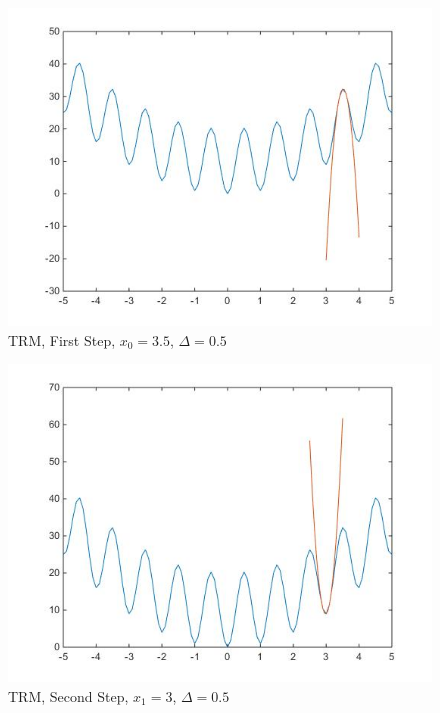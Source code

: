 \documentclass[hyperref={pdfpagelabels=false}]{beamer}
\begin{document}
\begin{frame}
\begin{figure}
\includegraphics[scale=0.4]{1DRast3.jpg}
\caption{TRM, First Step, $x_0=3.5$, $\Delta=0.5$}
\end{figure}
\end{frame}


\begin{frame}
\begin{figure}
\includegraphics[scale=0.4]{1DRast2.jpg}
\caption{TRM, Second Step, $x_1=3$, $\Delta=0.5$}
\end{figure}
\end{frame}
\end{document}
